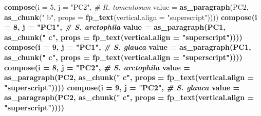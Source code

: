 \documentclass[
]{article}
\newenvironment{Shaded}{\begin{snugshade}}{\end{snugshade}}
\newcommand{\CommentTok}[1]{\textcolor[rgb]{0.56,0.35,0.01}{\textit{#1}}}
\newcommand{\DataTypeTok}[1]{\textcolor[rgb]{0.13,0.29,0.53}{#1}}
\newcommand{\DecValTok}[1]{\textcolor[rgb]{0.00,0.00,0.81}{#1}}
\newcommand{\KeywordTok}[1]{\textcolor[rgb]{0.13,0.29,0.53}{\textbf{#1}}}
\newcommand{\NormalTok}[1]{#1}
\newcommand{\OperatorTok}[1]{\textcolor[rgb]{0.81,0.36,0.00}{\textbf{#1}}}
\newcommand{\StringTok}[1]{\textcolor[rgb]{0.31,0.60,0.02}{#1}}
\begin{document}
\begin{Shaded}
\begin{Highlighting}[]
{{{{{{{{{{{{{{{{{{{{{{{{{\StringTok{  }\KeywordTok{compose}\NormalTok{(}\DataTypeTok{i =} \DecValTok{5}\NormalTok{, }\DataTypeTok{j =} \StringTok{"PC2"}\NormalTok{,   }\CommentTok{# R. tomentosum}
          \DataTypeTok{value =} \KeywordTok{as_paragraph}\NormalTok{(PC2,}
                               \KeywordTok{as_chunk}\NormalTok{(}\StringTok{" b"}\NormalTok{,}
                                        \DataTypeTok{props =} \KeywordTok{fp_text}\NormalTok{(}\DataTypeTok{vertical.align =} \StringTok{"superscript"}\NormalTok{)))) }\OperatorTok{%>%}\StringTok{ }
\StringTok{  }\KeywordTok{compose}\NormalTok{(}\DataTypeTok{i =} \DecValTok{8}\NormalTok{, }\DataTypeTok{j =} \StringTok{"PC1"}\NormalTok{,   }\CommentTok{# S. arctophila}
          \DataTypeTok{value =} \KeywordTok{as_paragraph}\NormalTok{(PC1,}
                               \KeywordTok{as_chunk}\NormalTok{(}\StringTok{" c"}\NormalTok{,}
                                        \DataTypeTok{props =} \KeywordTok{fp_text}\NormalTok{(}\DataTypeTok{vertical.align =} \StringTok{"superscript"}\NormalTok{)))) }\OperatorTok{%>%}\StringTok{ }
\StringTok{  }\KeywordTok{compose}\NormalTok{(}\DataTypeTok{i =} \DecValTok{9}\NormalTok{, }\DataTypeTok{j =} \StringTok{"PC1"}\NormalTok{,   }\CommentTok{# S. glauca}
          \DataTypeTok{value =} \KeywordTok{as_paragraph}\NormalTok{(PC1,}
                               \KeywordTok{as_chunk}\NormalTok{(}\StringTok{" c"}\NormalTok{,}
                                        \DataTypeTok{props =} \KeywordTok{fp_text}\NormalTok{(}\DataTypeTok{vertical.align =} \StringTok{"superscript"}\NormalTok{)))) }\OperatorTok{%>%}\StringTok{ }
\StringTok{  }\KeywordTok{compose}\NormalTok{(}\DataTypeTok{i =} \DecValTok{8}\NormalTok{, }\DataTypeTok{j =} \StringTok{"PC2"}\NormalTok{,   }\CommentTok{# S. arctophila}
          \DataTypeTok{value =} \KeywordTok{as_paragraph}\NormalTok{(PC2,}
                               \KeywordTok{as_chunk}\NormalTok{(}\StringTok{" c"}\NormalTok{,}
                                        \DataTypeTok{props =} \KeywordTok{fp_text}\NormalTok{(}\DataTypeTok{vertical.align =} \StringTok{"superscript"}\NormalTok{)))) }\OperatorTok{%>%}\StringTok{ }
\StringTok{  }\KeywordTok{compose}\NormalTok{(}\DataTypeTok{i =} \DecValTok{9}\NormalTok{, }\DataTypeTok{j =} \StringTok{"PC2"}\NormalTok{,   }\CommentTok{# S. glauca}
          \DataTypeTok{value =} \KeywordTok{as_paragraph}\NormalTok{(PC2,}
                               \KeywordTok{as_chunk}\NormalTok{(}\StringTok{" c"}\NormalTok{,}
                                        \DataTypeTok{props =} \KeywordTok{fp_text}\NormalTok{(}\DataTypeTok{vertical.align =} \StringTok{"superscript"}\NormalTok{)))) }\OperatorTok{%>%}
}}}}}}}}}}}}}}}}}}}}}}}}}}}}}}
\end{Highlighting}
\end{Shaded}
\end{document}
